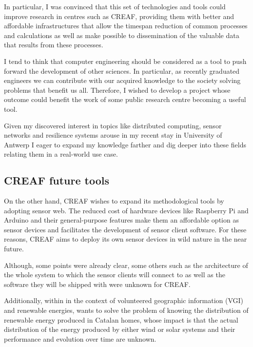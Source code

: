 In particular, I was convinced that this set of technologies and tools could improve research in centres such as CREAF, providing them with better and affordable infrastructures that allow the timespan reduction of common processes and calculations as well as make possible to dissemination of the valuable data that results from these processes.

I tend to think that computer engineering should be considered as a tool to push forward the development of other sciences. In particular, as recently graduated engineers we can contribute with our acquired knowledge to the society solving problems that benefit us all. Therefore, I wished to develop a project whose outcome could benefit the work of some public research centre becoming a useful tool.

Given my discovered interest in topics like distributed computing, sensor networks and resilience systems arouse in my recent stay in University of Antwerp I eager to expand my knowledge farther and dig deeper into these fields relating them in a real-world use case.

\subsection{CREAF future tools}

On the other hand, CREAF wishes to expand its methodological tools by adopting sensor web. The reduced cost of hardware devices like Raspberry Pi and Arduino  and their general-purpose features make them an affordable option as sensor devices and facilitates the development of sensor client software. For these reasons, CREAF aims to deploy its own sensor devices in wild nature in the near future. 

Although, some points were already clear, some others such as the architecture of the whole system to which the sensor clients will connect to as well as the software they will be shipped with were unknown for CREAF.

Additionally, within in the context of volunteered geographic information (VGI) and renewable energies, wants to solve the problem of knowing the distribution of renewable energy produced in Catalan homes, whose impact is that the actual distribution of the energy produced by either wind or solar systems and their performance and evolution over time are unknown. 


